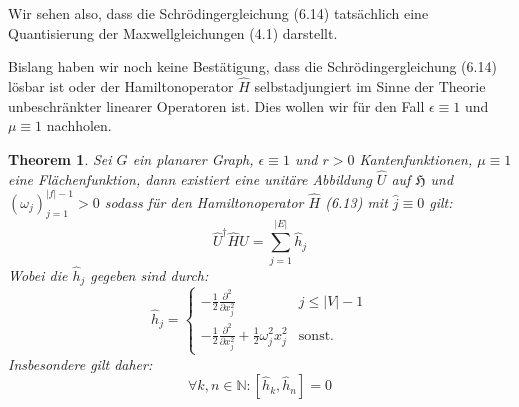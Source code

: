 \documentclass[11pt,a4paper,leqno]{report}
\newtheorem{theorem}{Theorem}[chapter]
\numberwithin{equation}{chapter}
\begin{document}
\noindent
Wir sehen also, dass die Schr\"odingergleichung (6.14) tats\"achlich eine Quantisierung der Maxwellgleichungen (4.1) darstellt.

Bislang haben wir noch keine Bestätigung, dass die Schr\"odingergleichung (6.14) l\"osbar ist oder der Hamiltonoperator $\hat{H}$ selbstadjungiert im Sinne der Theorie unbeschr\"ankter linearer Operatoren ist. Dies wollen wir f\"ur den Fall $\epsilon\equiv 1$ und $\mu\equiv 1$ nachholen.
\begin{theorem}
	Sei $G$ ein planarer Graph, $\epsilon\equiv 1$ und $r>0$ Kantenfunktionen, $\mu\equiv 1$ eine Fl\"achenfunktion, dann existiert eine unit\"are Abbildung $\hat{U}$ auf $\mathfrak{H}$ und $(\omega_j)_{j=1}^{|f|-1}>0$ sodass f\"ur den Hamiltonoperator $\hat{H}$ (6.13) mit $\hat{j}\equiv 0 $ gilt:
	\begin{equation}
	\hat{U}^\dagger\hat{H}\hat{U}  = \sum_{j=1}^{|E|}\hat{h}_j
	\end{equation}
Wobei die $\hat{h}_j$ gegeben sind durch:
\[\hat{h}_j= \begin{cases} 
-\frac{1}{2}\frac{\partial^2}{\partial x_j^2} & j\leq |V| - 1 \\
-\frac{1}{2}\frac{\partial^2}{\partial x_j^2} + \frac{1}{2}\omega_j^2 x_j^2 & \text{sonst.} 
\end{cases}
\]
Insbesondere gilt daher:
\begin{equation*}
	\forall k,n \in \mathbb{N}:[\hat{h}_k, \hat{h}_n]=0 
\end{equation*}
\end{theorem}
\end{document}

